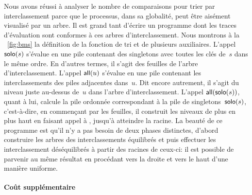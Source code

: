 Nous avons réussi à analyser le nombre de comparaisons pour trier par
interclassement parce que le processus, dans sa globalité, peut être
aisément visualisé par un arbre. Il est grand tant d'écrire un programme dont
les traces d'évaluation sont conformes à ces arbres
d'interclassement. Nous montrons à la \fig~\vref{fig:bms} la
définition de la fonction de tri  et
de plusieurs auxiliaires. L'appel
\(\textsf{solo}(s)\) s'évalue en une pile
contenant des singletons avec toutes les clés de~\(s\) dans le même
ordre. En d'autres termes, il s'agit des feuilles de l'arbre
d'interclassement. L'appel \(\textsf{all}(u)\)
s'évalue en une pile contenant les interclassements des piles
adjacentes dans~\(u\). Dit encore autrement, il s'agit du niveau juste
au-dessus de~\(u\) dans l'arbre d'interclassement. L'appel
\(\textsf{all}(\textsf{solo}(s))\), quant à lui, calcule la pile ordonnée
correspondant à la pile de singletons~\(\textsf{solo}(s)\), c'est-à-dire,
en commençant par les feuilles, il construit les niveaux de plus en
plus haut en faisant appel à ,
jusqu'à atteindre la racine. La beauté de ce programme est qu'il n'y a
pas besoin de deux phases distinctes, d'abord construire les arbres
des interclassements équilibrés et puis effectuer les interclassement
déséquilibrés à partir des racines de ceux-ci: il est possible de
parvenir au même résultat en procédant vers la droite et vers le haut
d'une manière uniforme.  

\paragraph{Coût supplémentaire}

